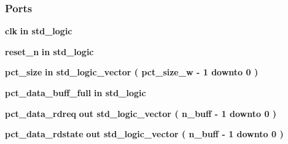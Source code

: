 \subsubsection*{Ports}
 \begin{DoxyCompactItemize}
\item 
{\bf clk}  {\bfseries {\bfseries \textcolor{keywordflow}{in}\textcolor{vhdlchar}{ }}} {\bfseries \textcolor{comment}{std\+\_\+logic}\textcolor{vhdlchar}{ }} 
\item 
{\bf reset\+\_\+n}  {\bfseries {\bfseries \textcolor{keywordflow}{in}\textcolor{vhdlchar}{ }}} {\bfseries \textcolor{comment}{std\+\_\+logic}\textcolor{vhdlchar}{ }} 
\item 
{\bf pct\+\_\+size}  {\bfseries {\bfseries \textcolor{keywordflow}{in}\textcolor{vhdlchar}{ }}} {\bfseries \textcolor{comment}{std\+\_\+logic\+\_\+vector}\textcolor{vhdlchar}{ }\textcolor{vhdlchar}{(}\textcolor{vhdlchar}{ }\textcolor{vhdlchar}{ }\textcolor{vhdlchar}{ }\textcolor{vhdlchar}{ }{\bfseries {\bf pct\+\_\+size\+\_\+w}} \textcolor{vhdlchar}{-\/}\textcolor{vhdlchar}{ } \textcolor{vhdldigit}{1} \textcolor{vhdlchar}{ }\textcolor{keywordflow}{downto}\textcolor{vhdlchar}{ }\textcolor{vhdlchar}{ } \textcolor{vhdldigit}{0} \textcolor{vhdlchar}{ }\textcolor{vhdlchar}{)}\textcolor{vhdlchar}{ }} 
\item 
{\bf pct\+\_\+data\+\_\+buff\+\_\+full}  {\bfseries {\bfseries \textcolor{keywordflow}{in}\textcolor{vhdlchar}{ }}} {\bfseries \textcolor{comment}{std\+\_\+logic}\textcolor{vhdlchar}{ }} 
\item 
{\bf pct\+\_\+data\+\_\+rdreq}  {\bfseries {\bfseries \textcolor{keywordflow}{out}\textcolor{vhdlchar}{ }}} {\bfseries \textcolor{comment}{std\+\_\+logic\+\_\+vector}\textcolor{vhdlchar}{ }\textcolor{vhdlchar}{(}\textcolor{vhdlchar}{ }\textcolor{vhdlchar}{ }\textcolor{vhdlchar}{ }\textcolor{vhdlchar}{ }{\bfseries {\bf n\+\_\+buff}} \textcolor{vhdlchar}{-\/}\textcolor{vhdlchar}{ } \textcolor{vhdldigit}{1} \textcolor{vhdlchar}{ }\textcolor{keywordflow}{downto}\textcolor{vhdlchar}{ }\textcolor{vhdlchar}{ } \textcolor{vhdldigit}{0} \textcolor{vhdlchar}{ }\textcolor{vhdlchar}{)}\textcolor{vhdlchar}{ }} 
\item 
{\bf pct\+\_\+data\+\_\+rdstate}  {\bfseries {\bfseries \textcolor{keywordflow}{out}\textcolor{vhdlchar}{ }}} {\bfseries \textcolor{comment}{std\+\_\+logic\+\_\+vector}\textcolor{vhdlchar}{ }\textcolor{vhdlchar}{(}\textcolor{vhdlchar}{ }\textcolor{vhdlchar}{ }\textcolor{vhdlchar}{ }\textcolor{vhdlchar}{ }{\bfseries {\bf n\+\_\+buff}} \textcolor{vhdlchar}{-\/}\textcolor{vhdlchar}{ } \textcolor{vhdldigit}{1} \textcolor{vhdlchar}{ }\textcolor{keywordflow}{downto}\textcolor{vhdlchar}{ }\textcolor{vhdlchar}{ } \textcolor{vhdldigit}{0} \textcolor{vhdlchar}{ }\textcolor{vhdlchar}{)}\textcolor{vhdlchar}{ }} 

\end{DoxyCompactItemize}
